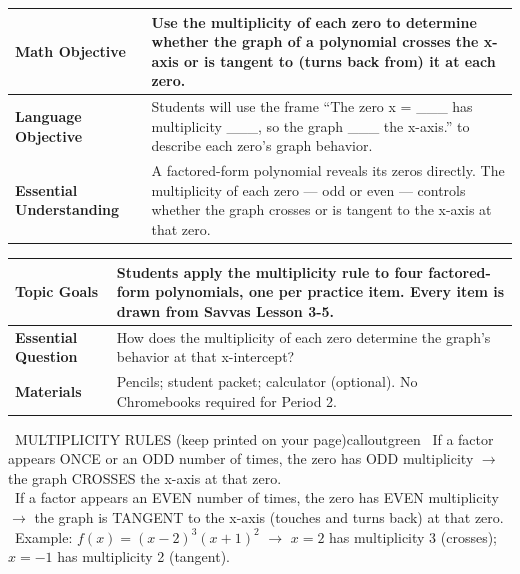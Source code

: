 \documentclass[11pt]{article}
\newcommand{\lessonrow}[2]{\textbf{#1} & #2 \\ \hline}
\begin{document}

{\small
\renewcommand{\arraystretch}{1.25}
\noindent\begin{tabular}{|p{1.8in}|p{4.8in}|}
\hline
\lessonrow{Math Objective}{Use the multiplicity of each zero to determine whether the graph of a polynomial crosses the x-axis or is tangent to (turns back from) it at each zero.}
\lessonrow{Language Objective}{Students will use the frame ``The zero x = \_\_\_ has multiplicity \_\_\_, so the graph \_\_\_ the x-axis.'' to describe each zero's graph behavior.}
\lessonrow{Essential Understanding}{A factored-form polynomial reveals its zeros directly. The multiplicity of each zero --- odd or even --- controls whether the graph crosses or is tangent to the x-axis at that zero.}
\end{tabular}
}

{\small
\renewcommand{\arraystretch}{1.25}
\noindent\begin{tabular}{|p{1.8in}|p{4.8in}|}
\hline
\lessonrow{Topic Goals}{Students apply the multiplicity rule to four factored-form polynomials, one per practice item. Every item is drawn from Savvas Lesson 3-5.}
\lessonrow{Essential Question}{How does the multiplicity of each zero determine the graph's behavior at that x-intercept?}
\lessonrow{Materials}{Pencils; student packet; calculator (optional). No Chromebooks required for Period 2.}
\end{tabular}
}


\begin{callout}{\IconBook\ MULTIPLICITY RULES (keep printed on your page)}{calloutgreen}
\textbullet\ If a factor appears ONCE or an ODD number of times, the zero has ODD multiplicity \(\rightarrow\) the graph CROSSES the x-axis at that zero.\\
\textbullet\ If a factor appears an EVEN number of times, the zero has EVEN multiplicity \(\rightarrow\) the graph is TANGENT to the x-axis (touches and turns back) at that zero.\\
\textbullet\ Example: \(f(x) = (x - 2)^3(x + 1)^2\) \(\rightarrow\) \(x = 2\) has multiplicity 3 (crosses); \(x = -1\) has multiplicity 2 (tangent).
\end{callout}
\end{document}
